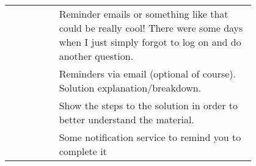 {\begin{longtable}{R|p{0.8\linewidth}}
		& Reminder emails or something like that could be really cool! There were some days when I just simply forgot to log on and do another question.                                                                                                                                                                                                                                                                                                                                                                                                                                                                                                                                                                                                   \\
		& Reminders via email (optional of course). Solution explanation/breakdown.                                                                                                                                                                                                                                                                                                                                                                                                                                                                                                                                                                                                                                                                        \\
		& Show the steps to the solution in order to better understand the material.                                                                                                                                                                                                                                                                                                                                                                                                                                                                                                                                                                                                                                                                       \\
		& Some notification service to remind you to complete it                                                                                                                                                                                                                                                                                                                                                                                                                                                                                                                                                                                                                                                                                           \\

\end{longtable}}
